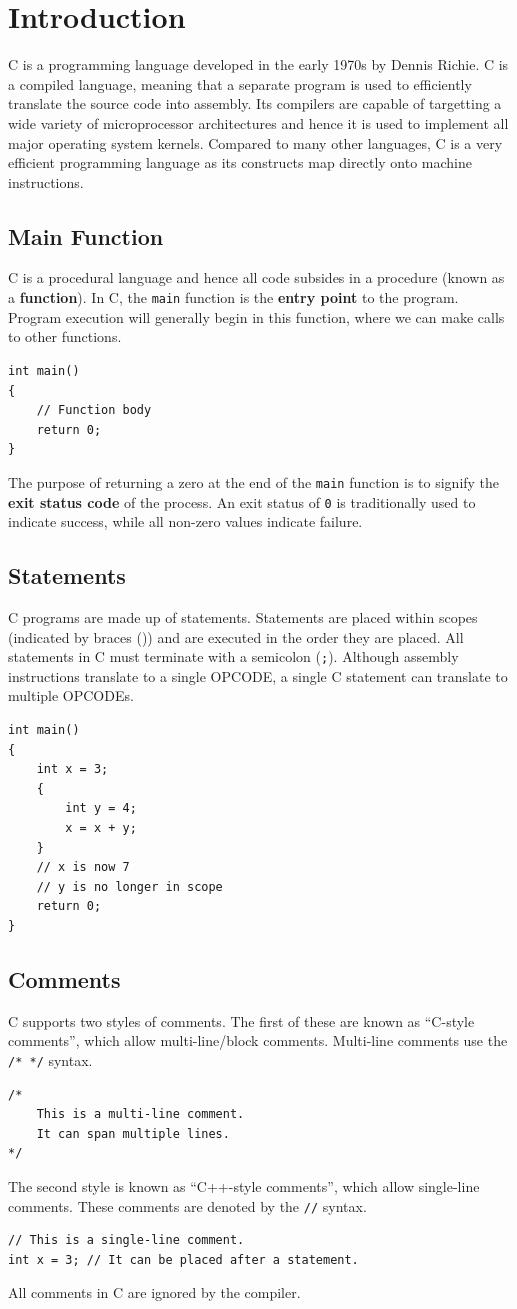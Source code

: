 \documentclass{report}
\begin{document}
\chapter{Introduction}
C is a programming language developed in the early 1970s by Dennis Richie.
C is a compiled language, meaning that a separate program is used to
efficiently translate the source code into assembly.
Its compilers are capable of targetting a wide variety of microprocessor architectures
and hence it is used to implement all major operating system kernels.
Compared to many other languages, C is a very efficient programming
language as its constructs map directly onto machine instructions.
\section{Main Function}
C is a procedural language and hence all code subsides in a procedure (known as a \textbf{function}).
In C, the \texttt{main} function is the \textbf{entry point} to the program.
Program execution will generally begin in this function, where we can make calls to other functions.
\begin{verbatim}
int main()
{
    // Function body
    return 0;
}
\end{verbatim}
The purpose of returning a zero at the end of the \texttt{main} function
is to signify the \textbf{exit status code} of the process. An exit status of \texttt{0} is traditionally
used to indicate success, while all non-zero values indicate failure.
\section{Statements}
C programs are made up of statements. Statements are placed within scopes (indicated by braces (\texttt{{}}))
and are executed in the order they are placed. All statements in C must terminate with a semicolon (\texttt{;}).
Although assembly instructions translate to a single OPCODE, a single C statement can translate to multiple OPCODEs.
\begin{verbatim}
int main()
{
    int x = 3;
    {
        int y = 4;
        x = x + y;
    }
    // x is now 7
    // y is no longer in scope
    return 0;
}
\end{verbatim}
\section{Comments}
C supports two styles of comments. The first of these are known as ``C-style comments'', which
allow multi-line/block comments. Multi-line comments use the \texttt{/* */} syntax.
\begin{verbatim}
/*
    This is a multi-line comment.
    It can span multiple lines.
*/
\end{verbatim}
The second style is known as ``C++-style comments'', which allow single-line comments.
These comments are denoted by the \texttt{//} syntax.
\begin{verbatim}
// This is a single-line comment.
int x = 3; // It can be placed after a statement.
\end{verbatim}
All comments in C are ignored by the compiler.
\end{document}
